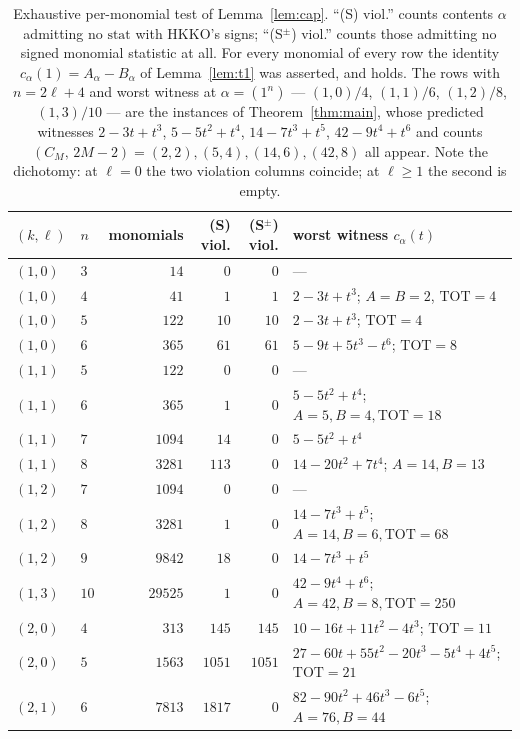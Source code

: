 \documentclass[11pt]{article}
\theoremstyle{definition}
\begin{document}
\begin{table}[h]\centering
\begin{tabular}{llrrrl}
\hline
$(k,\ell)$ & $n$ & monomials & (S) viol. & (S$^\pm$) viol. & worst witness $c_\alpha(t)$ \\
\hline
$(1,0)$ & $3$  & $14$    & $0$    & $0$    & --- \\
$(1,0)$ & $4$  & $41$    & $1$    & $1$    & $2-3t+t^{3}$; $A{=}B{=}2$, $\mathrm{TOT}{=}4$ \\
$(1,0)$ & $5$  & $122$   & $10$   & $10$   & $2-3t+t^{3}$; $\mathrm{TOT}{=}4$ \\
$(1,0)$ & $6$  & $365$   & $61$   & $61$   & $5-9t+5t^{3}-t^{6}$; $\mathrm{TOT}{=}8$ \\
$(1,1)$ & $5$  & $122$   & $0$    & $0$    & --- \\
$(1,1)$ & $6$  & $365$   & $1$    & $0$    & $5-5t^{2}+t^{4}$; $A{=}5,B{=}4,\mathrm{TOT}{=}18$ \\
$(1,1)$ & $7$  & $1094$  & $14$   & $0$    & $5-5t^{2}+t^{4}$ \\
$(1,1)$ & $8$  & $3281$  & $113$  & $0$    & $14-20t^{2}+7t^{4}$; $A{=}14,B{=}13$ \\
$(1,2)$ & $7$  & $1094$  & $0$    & $0$    & --- \\
$(1,2)$ & $8$  & $3281$  & $1$    & $0$    & $14-7t^{3}+t^{5}$; $A{=}14,B{=}6,\mathrm{TOT}{=}68$ \\
$(1,2)$ & $9$  & $9842$  & $18$   & $0$    & $14-7t^{3}+t^{5}$ \\
$(1,3)$ & $10$ & $29525$ & $1$    & $0$    & $42-9t^{4}+t^{6}$; $A{=}42,B{=}8,\mathrm{TOT}{=}250$ \\
$(2,0)$ & $4$  & $313$   & $145$  & $145$  & $10-16t+11t^{2}-4t^{3}$; $\mathrm{TOT}{=}11$ \\
$(2,0)$ & $5$  & $1563$  & $1051$ & $1051$ & $27-60t+55t^{2}-20t^{3}-5t^{4}+4t^{5}$; $\mathrm{TOT}{=}21$ \\
$(2,1)$ & $6$  & $7813$  & $1817$ & $0$    & $82-90t^{2}+46t^{3}-6t^{5}$; $A{=}76,B{=}44$ \\
\hline
\end{tabular}
\caption{Exhaustive per-monomial test of Lemma~\ref{lem:cap}. ``(S) viol.''
counts contents $\alpha$ admitting no $\mathrm{stat}$ with HKKO's signs;
``(S$^\pm$) viol.'' counts those admitting no signed monomial statistic at all.
For every monomial of every row the identity $c_\alpha(1)=A_\alpha-B_\alpha$ of
Lemma~\ref{lem:t1} was asserted, and holds. The rows with
$n=2\ell+4$ and worst witness at $\alpha=(1^{n})$ --- $(1,0)/4$, $(1,1)/6$,
$(1,2)/8$, $(1,3)/10$ --- are the instances of Theorem~\ref{thm:main}, whose
predicted witnesses $2-3t+t^{3}$, $5-5t^{2}+t^{4}$, $14-7t^{3}+t^{5}$,
$42-9t^{4}+t^{6}$ and counts $(C_M,\,2M-2)=(2,2),(5,4),(14,6),(42,8)$ all
appear. Note the dichotomy: at $\ell=0$ the two violation columns coincide; at
$\ell\ge1$ the second is empty.}
\label{tab:sweep}
\end{table}
\end{document}
